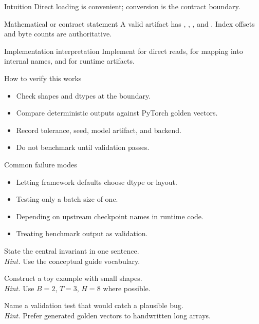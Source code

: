 \begin{intuitionbox}{Intuition}
Direct loading is convenient; conversion is the contract boundary.
\end{intuitionbox}

\begin{definitionbox}{Mathematical or contract statement}
A valid artifact has , , , and . Index offsets and byte counts are authoritative.
\end{definitionbox}

\begin{implementationbox}{Implementation interpretation}
Implement  for direct reads,  for mapping into internal names, and  for runtime artifacts.
\end{implementationbox}

\begin{verificationbox}{How to verify this works}
\begin{itemize}
\item Check shapes and dtypes at the boundary.
\item Compare deterministic outputs against PyTorch golden vectors.
\item Record tolerance, seed, model artifact, and backend.
\item Do not benchmark until validation passes.
\end{itemize}
\end{verificationbox}

\begin{warningbox}{Common failure modes}
\begin{itemize}
\item Letting framework defaults choose dtype or layout.
\item Testing only a batch size of one.
\item Depending on upstream checkpoint names in runtime code.
\item Treating benchmark output as validation.
\end{itemize}
\end{warningbox}

\begin{chapterexercises}
\item State the central invariant in one sentence.\\
\textit{Hint.} Use the conceptual guide vocabulary.
\item Construct a toy example with small shapes.\\
\textit{Hint.} Use $B=2$, $T=3$, $H=8$ where possible.
\item Name a validation test that would catch a plausible bug.\\
\textit{Hint.} Prefer generated golden vectors to handwritten long arrays.
\end{chapterexercises}

